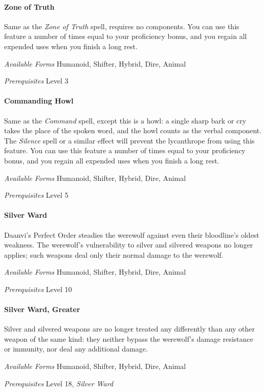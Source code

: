 \documentclass[twocolumn]{dndbook}
\begin{document}
\paragraph*{Zone of Truth}
Same as the \emph{Zone of Truth} spell, requires no components.
You can use this feature a number of times equal to your proficiency bonus, and you regain all expended uses when you finish a long rest.\par
\emph{Available Forms} Humanoid, Shifter, Hybrid, Dire, Animal\par
\emph{Prerequisites} Level 3\par

\paragraph*{Commanding Howl}
Same as the \emph{Command} spell, except this is a howl: a single sharp bark or cry takes the place of the spoken word, and the howl counts as the verbal component.
The \emph{Silence} spell or a similar effect will prevent the lycanthrope from using this feature.
You can use this feature a number of times equal to your proficiency bonus, and you regain all expended uses when you finish a long rest.\par
\emph{Available Forms} Humanoid, Shifter, Hybrid, Dire, Animal\par
\emph{Prerequisites} Level 5\par

\paragraph*{Silver Ward}
Daanvi's Perfect Order steadies the werewolf against even their bloodline's oldest weakness.
The werewolf's vulnerability to silver and silvered weapons no longer applies; such weapons deal only their normal damage to the werewolf.\par
\emph{Available Forms} Humanoid, Shifter, Hybrid, Dire, Animal\par
\emph{Prerequisites} Level 10\par

\paragraph*{Silver Ward, Greater}
Silver and silvered weapons are no longer treated any differently than any other weapon of the same kind: they neither bypass the werewolf's damage resistance or immunity, nor deal any additional damage.\par
\emph{Available Forms} Humanoid, Shifter, Hybrid, Dire, Animal\par
\emph{Prerequisites} Level 18, \emph{Silver Ward}\par
\end{document}

